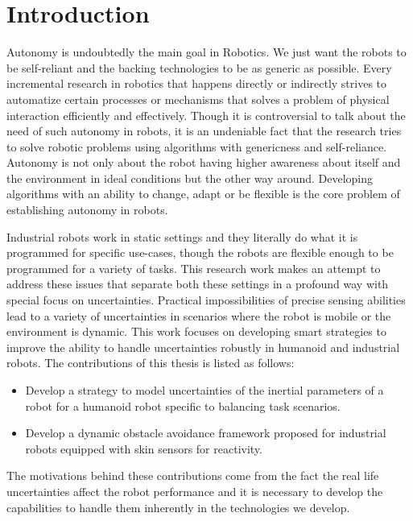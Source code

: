 \documentclass[a4paper,11pt,twoside]{StyleThese}
\begin{document}
\fi


\chapter*{Introduction}
Autonomy is undoubtedly the main goal in Robotics. We just want the robots to be self-reliant and the backing technologies to be as generic as possible. Every incremental research in robotics that happens directly or indirectly strives to automatize certain processes or mechanisms that solves a problem of physical interaction efficiently and effectively. Though it is controversial to talk about the need of such autonomy in robots, it is an undeniable fact that the research tries to solve robotic problems using algorithms with genericness and self-reliance. Autonomy is not only about the robot having higher awareness about itself and the environment in ideal conditions but the other way around. Developing algorithms with an ability to change, adapt or be flexible is the core problem of establishing autonomy in robots. 

Industrial robots work in static settings and they literally do what it is programmed for specific use-cases, though the robots are flexible enough to be programmed for a variety of tasks. This research work makes an attempt to address these issues that separate both these settings in a profound way with special focus on uncertainties. Practical impossibilities of precise sensing abilities lead to a variety of uncertainties in scenarios where the robot is mobile or the environment is dynamic. This work focuses on developing smart strategies to improve the ability to handle uncertainties robustly in humanoid and industrial robots. The contributions of this thesis is listed as follows:
\begin{itemize}
    \item Develop a strategy to model uncertainties of the inertial parameters of a robot for a humanoid robot specific to balancing task scenarios.
    \item Develop a dynamic obstacle avoidance framework proposed for industrial robots equipped with skin sensors for reactivity. 
\end{itemize}
The motivations behind these contributions come from the fact the real life uncertainties affect the robot performance and it is necessary to develop the capabilities to handle them inherently in the technologies we develop.


\end{document}
